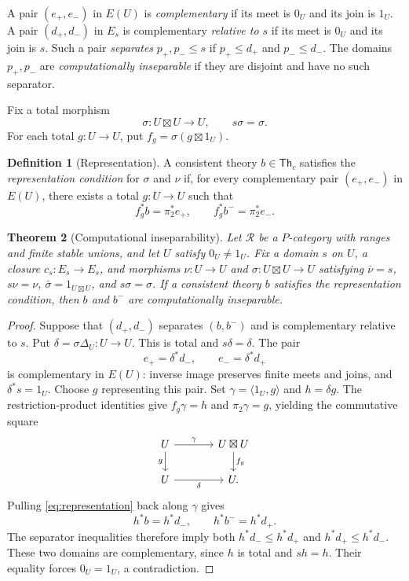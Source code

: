 \documentclass[11pt]{article}
\newtheorem{theorem}{Theorem}[section]
\theoremstyle{definition}
\newtheorem{definition}[theorem]{Definition}
\newcommand{\R}{\mathscr R}
\newcommand{\Th}{\mathsf{Th}}
\begin{document}
A pair $(e_+,e_-)$ in $E(U)$ is \emph{complementary} if its meet is $0_U$
and its join is $1_U$. A pair $(d_+,d_-)$ in $E_s$ is complementary
\emph{relative to $s$} if its meet is $0_U$ and its join is $s$.
Such a pair \emph{separates} $p_+,p_-\le s$ if $p_+\le d_+$ and
$p_-\le d_-$. The domains $p_+,p_-$ are \emph{computationally inseparable}
if they are disjoint and have no such separator.

Fix a total morphism
\[
 \sigma:U\boxtimes U\longrightarrow U,\qquad s\sigma=\sigma.
\]
For each total $g:U\to U$, put $f_g=\sigma(g\boxtimes1_U)$.

\begin{definition}[Representation]\label{def:representation}
A consistent theory $b\in\Th_c$ satisfies the \emph{representation condition}
for $\sigma$ and $\nu$ if, for every complementary pair $(e_+,e_-)$ in
$E(U)$, there exists a total $g:U\to U$ such that
\begin{equation}\label{eq:representation}
 f_g^*b=\pi_2^*e_+,\qquad
 f_g^*b^-=\pi_2^*e_-.
\end{equation}
\end{definition}

\begin{theorem}[Computational inseparability]\label{thm:inseparability}
Let $\R$ be a $P$-category with ranges and finite stable unions, and let
$U$ satisfy $0_U\ne1_U$. Fix a domain $s$ on $U$, a closure $c_s:E_s\to E_s$,
and morphisms $\nu:U\to U$ and $\sigma:U\boxtimes U\to U$ satisfying
$\bar\nu=s$, $s\nu=\nu$, $\bar\sigma=1_{U\boxtimes U}$, and
$s\sigma=\sigma$. If a consistent theory $b$ satisfies the representation
condition, then $b$ and $b^-$ are computationally inseparable.
\end{theorem}
\begin{proof}
Suppose that $(d_+,d_-)$ separates $(b,b^-)$ and is complementary relative to
$s$. Put $\delta=\sigma\Delta_U:U\to U$. This is total and $s\delta=\delta$.
The pair
\[
 e_+=\delta^*d_-,\qquad e_-=\delta^*d_+
\]
is complementary in $E(U)$: inverse image preserves finite meets and joins,
and $\delta^*s=1_U$. Choose $g$ representing this pair. Set
$\gamma=\langle1_U,g\rangle$ and $h=\delta g$. The restriction-product
identities give $f_g\gamma=h$ and $\pi_2\gamma=g$, yielding the commutative
square
\[
\begin{tikzcd}[column sep=large]
 U \arrow[r,"\gamma"] \arrow[d,"g"'] & U\boxtimes U \arrow[d,"f_g"]\\
 U \arrow[r,"\delta"'] & U.
\end{tikzcd}
\]
Pulling \eqref{eq:representation} back along $\gamma$ gives
\[
 h^*b=h^*d_-,\qquad h^*b^-=h^*d_+.
\]
The separator inequalities therefore imply both
$h^*d_-\le h^*d_+$ and $h^*d_+\le h^*d_-$. These two domains are
complementary, since $h$ is total and $sh=h$. Their equality forces
$0_U=1_U$, a contradiction.
\end{proof}
\end{document}
